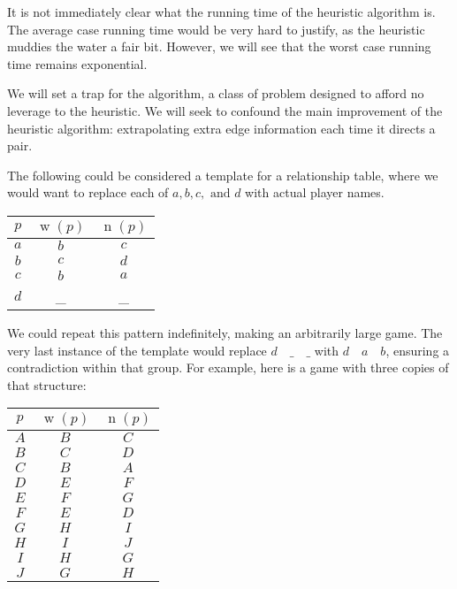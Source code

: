 \documentclass[12pt,x11names, rgb]{article}
\DeclareMathOperator{\w}{w}
\DeclareMathOperator{\n}{n}
\begin{document}
    It is not immediately clear what the running time of the heuristic algorithm is. The average case running time would be very hard to justify, as the heuristic muddies the water a fair bit. However, we will see that the worst case running time remains exponential.

    We will set a trap for the algorithm, a class of problem designed to afford no leverage to the heuristic. We will seek to confound the main improvement of the heuristic algorithm: extrapolating extra edge information each time it directs a pair. 

    The following could be considered a template for a relationship table, where we would want to replace each of $a, b, c, \text{ and }d$ with actual player names.

    \begin{center}
        \begin{tabular}{c | c | c}
            $p$ & $\w(p)$ & $\n(p)$\\
            \hline
            $a$ & $b$ & $c$\\
            $b$ & $c$ & $d$\\
            $c$ & $b$ & $a$\\
            $d$ & \_ & \_
        \end{tabular}
    \end{center}

    We could repeat this pattern indefinitely, making an arbitrarily large game. The very last instance of the template would replace $d \quad \_ \quad \_$ with $d \quad a \quad b$, ensuring a contradiction within that group. For example, here is a game with three copies of that structure:

    \begin{center}
        \begin{tabular}{c | c | c}
            $p$ & $\w(p)$ & $\n(p)$\\
            \hline
            $A$ & $B$ & $C$\\
            $B$ & $C$ & $D$\\
            $C$ & $B$ & $A$\\
            \hline
            $D$ & $E$ & $F$\\
            $E$ & $F$ & $G$\\
            $F$ & $E$ & $D$\\
            \hline
            $G$ & $H$ & $I$\\
            $H$ & $I$ & $J$\\
            $I$ & $H$ & $G$\\
            $J$ & $G$ & $H$
        \end{tabular}
    \end{center}
\end{document}
